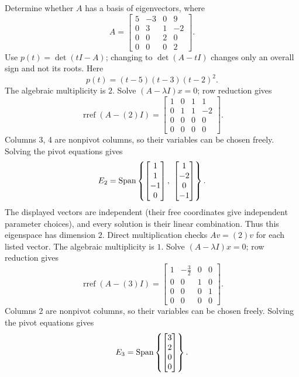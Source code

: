 \goal Determine whether $A$ has a basis of eigenvectors, where
\[A=\begin{bmatrix}5&-3&0&9\\0&3&1&-2\\0&0&2&0\\0&0&0&2\end{bmatrix}.\]
Use $p(t)=\det(tI-A)$; changing to $\det(A-tI)$ changes only an overall sign and not its roots. Here
\[p(t)=\left(t - 5\right) \left(t - 3\right) \left(t - 2\right)^{2}.\]
The algebraic multiplicity is $2$. Solve $(A-\lambda I)x=0$; row reduction gives
\[\operatorname{rref}(A-(2)I)=\begin{bmatrix}1&0&1&1\\0&1&1&-2\\0&0&0&0\\0&0&0&0\end{bmatrix}.\]
Columns 3, 4 are nonpivot columns, so their variables can be chosen freely. Solving the pivot equations gives
\[E_{2}=\Span\left\{\begin{bmatrix}1\\1\\-1\\0\end{bmatrix},\ \begin{bmatrix}1\\-2\\0\\-1\end{bmatrix}\right\}.\]
The displayed vectors are independent (their free coordinates give independent parameter choices), and every solution is their linear combination. Thus this eigenspace has dimension $2$. Direct multiplication checks $Av=(2)v$ for each listed vector.
The algebraic multiplicity is $1$. Solve $(A-\lambda I)x=0$; row reduction gives
\[\operatorname{rref}(A-(3)I)=\begin{bmatrix}1&- \frac{3}{2}&0&0\\0&0&1&0\\0&0&0&1\\0&0&0&0\end{bmatrix}.\]
Columns 2 are nonpivot columns, so their variables can be chosen freely. Solving the pivot equations gives
\[E_{3}=\operatorname{Span}\left\{\begin{bmatrix}3\\2\\0\\0\end{bmatrix}\right\}.\]
